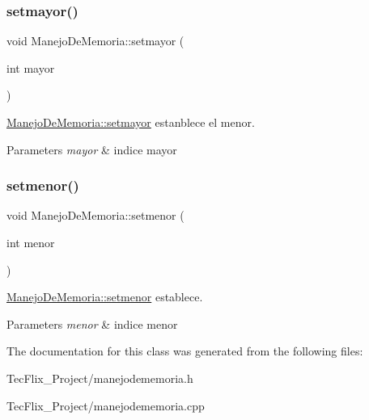 \subsubsection{\texorpdfstring{setmayor()}{setmayor()}}
{\footnotesize\ttfamily void Manejo\+De\+Memoria\+::setmayor (\begin{DoxyParamCaption}\item[{int}]{mayor }\end{DoxyParamCaption})}



\hyperlink{classManejoDeMemoria_a867d2a0b738d0a3c1635517166928ec8}{Manejo\+De\+Memoria\+::setmayor} estanblece el menor. 


\begin{DoxyParams}{Parameters}
{\em mayor} & indice mayor \\
\hline
\end{DoxyParams}
\mbox{\label{classManejoDeMemoria_a381338b7926d5cb1feef9f7ed6408e33}} 
\subsubsection{\texorpdfstring{setmenor()}{setmenor()}}
{\footnotesize\ttfamily void Manejo\+De\+Memoria\+::setmenor (\begin{DoxyParamCaption}\item[{int}]{menor }\end{DoxyParamCaption})}



\hyperlink{classManejoDeMemoria_a381338b7926d5cb1feef9f7ed6408e33}{Manejo\+De\+Memoria\+::setmenor} establece. 


\begin{DoxyParams}{Parameters}
{\em menor} & indice menor \\
\hline
\end{DoxyParams}


The documentation for this class was generated from the following files\+:\begin{DoxyCompactItemize}
\item 
Tec\+Flix\+\_\+\+Project/manejodememoria.\+h\item 
Tec\+Flix\+\_\+\+Project/manejodememoria.\+cpp\end{DoxyCompactItemize}
